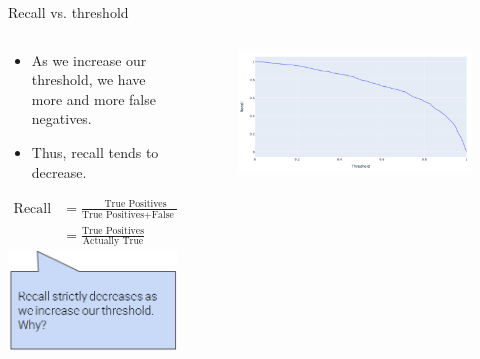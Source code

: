 \documentclass[aspectratio=169]{../latex_main/tntbeamer}  %
\begin{document}
	
	\begin{frame}{Recall vs. threshold}
	    \begin{columns}
	        \begin{column}{.5\textwidth}
	             \begin{itemize}
	                 \item As we increase our threshold, we have more and more false negatives.
	                 \item Thus, recall tends to decrease.
	             \end{itemize} 
	             
	             \begin{align*}
	                 \text{Recall} &= \frac{\text{True Positives}}{\text{True Positives} + \text{False Negatives}}\\
	                 &= \frac{\text{True Positives}}{\text{Actually True}}
	             \end{align*}
	                 \hspace{3cm} \includegraphics[scale=.23]{Bild20}
	        \end{column}
	        
	        
	        \begin{column}{.5\textwidth}
	                \begin{figure}
	                    \centering
	                    \includegraphics[scale=.6]{Bild21}
	                \end{figure}
	                
	                
	        \end{column}
	        
	    \end{columns}
	\end{frame}
	
\end{document}

